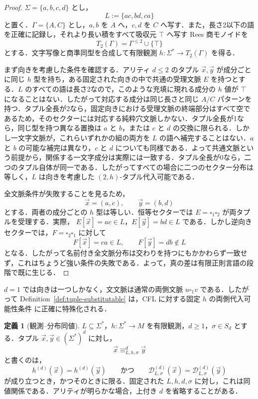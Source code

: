 \documentclass[11pt,a4paper]{ltjsarticle}
\numberwithin{equation}{section}
\theoremstyle{plain}
\theoremstyle{definition}
\newtheorem{definition}[theorem]{定義}
\theoremstyle{remark}
\newcommand{\D}{\mathcal{D}}
\newcommand{\tuple}[1]{\vec{#1}}
\newcommand{\blank}{\square}
\begin{document}
\begin{proof}
$\Sigma=\{a,b,c,d\}$ とし，
\[
  L:=\{ac,bd,ca\}
\]
と置く．$\Gamma=\{A,C\}$ とし，$a,b$ を $A$ へ，$c,d$ を $C$ へ写す．また，長さ2以下の語を正確に記録し，それより長い積をすべて吸収元 $\top$ へ写す Rees 商モノイドを
\[
T_2(\Gamma)=\Gamma^{\le2}\cup\{\top\}
\]
とする．文字写像と商準同型を合成して有限観測 $h:\Sigma^*\to T_2(\Gamma)$ を得る．

まず向きを考慮した条件を確認する．アリティ $d\le2$ のタプル $\tuple x,\tuple y$ が成分ごとに同じ $h$ 型を持ち，ある固定された向きの中で共通の受理文脈 $E$ を持つとする．$L$ のすべての語は長さ2なので，このような充填に現れる成分の $h$ 値が $\top$ になることはない．したがって対応する成分は同じ長さと同じ $A/C$ パターンを持つ．タプル全長が2なら，固定向きにおける受理文脈の終端部分はすべて空であるため，そのセクターには対応する純粋穴文脈しかない．タプル全長が1なら，同じ型を持つ異なる置換は $a$ と $b$，または $c$ と $d$ の交換に限られる．しかし一文字文脈が，これらいずれかの組の両方を $L$ の語へ補完することはない．$a$ と $b$ の可能な補完は異なり，$c$ と $d$ についても同様である．よって共通文脈という前提から，関係する一文字成分は実際には一致する．タプル全長が0なら，二つのタプル自体が同一である．したがってすべての場合に二つのセクター分布は等しく，$L$ は向きを考慮した $(2,h)$-タプル代入可能である．

全文脈条件が失敗することを見るため，
\[
  \tuple x=(a,c),\qquad \tuple y=(b,d)
\]
とする．両者の成分ごとの $h$ 型は等しい．恒等セクターでは $E=\blank_1\blank_2$ が両タプルを受理する．実際，
$E[\tuple x]=ac\in L$，$E[\tuple y]=bd\in L$ である．しかし逆向きセクターでは，$F=\blank_2\blank_1$ に対して
\[
  F[\tuple x]=ca\in L,
  \qquad
  F[\tuple y]=db\notin L
\]
となる．したがって名前付き全文脈分布は交わりを持つにもかかわらず一致せず，これはちょうど強い条件の失敗である．よって，真の差は有限正則言語の段階で既に生じる．
\end{proof}

$d=1$ では向きは一つしかなく，文文脈は通常の両側文脈 $u\blank_1v$ である．したがって Definition~\ref{def:tuple-substitutable} は，CFL に対する固定 $h$ の両側代入可能性条件
\cite{kuriyamaCFG} に正確に特殊化される．

\begin{definition}[観測--分布同値]
\label{def:observation-distribution-equivalence}
$L\subseteq\Sigma^*$，$h:\Sigma^*\to M$ を有限観測，$d\ge1$，$\sigma\in S_d$ とする．タプル $\tuple x,\tuple y\in(\Sigma^*)^d$ に対し，
\[
  \tuple x\equiv_{L,h,\sigma}^d\tuple y
\]
と書くのは，
\[
  h^{(d)}(\tuple x)=h^{(d)}(\tuple y)
  \qquad\text{かつ}\qquad
  \D_{L,\sigma}^{(d)}(\tuple x)=\D_{L,\sigma}^{(d)}(\tuple y)
\]
が成り立つとき，かつそのときに限る．固定された $L,h,d,\sigma$ に対し，これは同値関係である．アリティが明らかな場合，上付き $d$ を省略することがある．
\end{definition}
\end{document}
